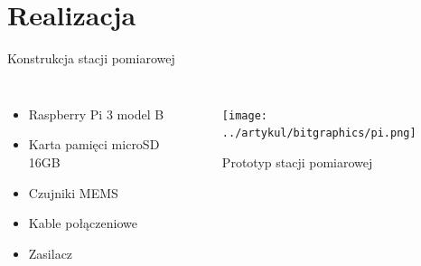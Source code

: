 \documentclass[aspectratio=1610,polish]{beamer} %
\begin{document}
  \section{Realizacja}
  \begin{frame}{Konstrukcja stacji pomiarowej}
    \begin{columns}
      \begin{itemize}
	\item Raspberry Pi 3 model B
	\item Karta pamięci microSD 16GB
	\item Czujniki MEMS
	\item Kable połączeniowe
	\item Zasilacz
      \end{itemize}
      \begin{figure}
	\texttt{[image: ../artykul/bitgraphics/pi.png]}
	\caption{Prototyp stacji pomiarowej}
      \end{figure}
    \end{columns}
  \end{frame}
\end{document}
